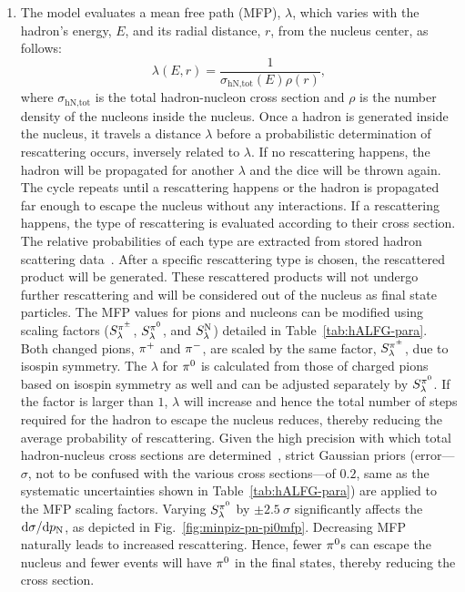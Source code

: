 \begin{enumerate}
    \item 
The model evaluates a mean free path (MFP), $\lambda$, which varies with the hadron's energy, $E$, and its radial distance, $r$, from the nucleus center,  as follows:
\begin{equation}
    \lambda(E,r) = \frac{1}{\sigma_\textrm{hN,tot}(E)\rho(r)},
\end{equation}
where $\sigma_\textrm{hN,tot}$ is the total hadron-nucleon cross section and $\rho$ is the number density of the nucleons inside the nucleus. Once a hadron is generated inside the nucleus, it travels a distance $\lambda$ before a probabilistic determination of rescattering occurs, inversely related to  $\lambda$. If no rescattering happens, the hadron will be propagated for another $\lambda$ and the dice will be thrown again. The cycle repeats until a rescattering happens or the hadron is propagated far enough to escape the nucleus without any interactions. If a rescattering happens, the type of rescattering is evaluated according to their cross section. The relative probabilities of each type are extracted from stored hadron scattering data~\cite{LADS:1999dyv,Navon:1983xj,Carroll:1976hj,Clough:1974qt,BAUHOFF1986429,Mashnik:2000up,Ishibashi:1997gbe}. After a specific rescattering type is chosen, the rescattered product will be generated. These rescattered products will not undergo further rescattering and will be considered out of the nucleus as final state particles.  
The MFP values for pions and nucleons can be modified using scaling factors  ($S_\lambda^{\pi^{\pm}}$, $S_\lambda^{\pi^{0}}$,  and $S_\lambda^\textrm{N}$) detailed in Table~\ref{tab:hALFG-para}. Both changed pions, $\pi^+$ and $\pi^-$, are scaled by the same factor, $S_\lambda^{\pi^{\pm}}$, due to isospin symmetry. The $\lambda$ for $\pi^0$ is calculated from those of charged pions based on isospin symmetry as well and can be adjusted separately by $S_\lambda^{\pi^{0}}$. If the factor is larger than $1$, $\lambda$ will increase and hence the total number of steps required for the hadron to escape the nucleus reduces, thereby reducing the average probability of rescattering. 
Given the high precision with which total hadron-nucleus cross sections are determined~\cite{LADS:1999dyv,Navon:1983xj,Carroll:1976hj,Clough:1974qt,BAUHOFF1986429}, strict Gaussian priors (error---$\sigma$, not to be confused with the various cross sections---of $0.2$, same as the systematic uncertainties shown in Table~\ref{tab:hALFG-para}) are applied to the MFP scaling factors. 
Varying $S_\lambda^{\pi^{0}}$ by $\pm2.5~\sigma$ significantly affects the \minpiz $\textrm{d}\sigma/\textrm{d}p_\textrm{N}$, as depicted in Fig.~\ref{fig:minpiz-pn-pi0mfp}. Decreasing MFP naturally leads to increased rescattering. Hence, fewer $\pi^0$s can escape the nucleus and fewer events will have $\pi^0$ in the final states, thereby reducing the cross section. 


\end{enumerate}
